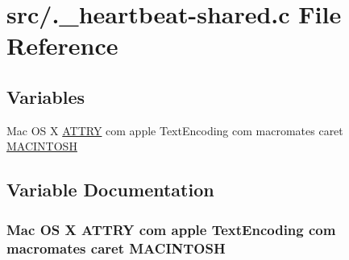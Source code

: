 \hypertarget{_8__heartbeat-shared_8c}{
\section{src/.\_\-heartbeat-shared.c File Reference}
\label{_8__heartbeat-shared_8c}
}
\subsection*{Variables}
\begin{CompactItemize}
\item 
Mac OS X \hyperlink{_8__heartbeat-file_8c_5061a8b42c1273d5dac6ba84a12ccd49}{ATTRY} com apple TextEncoding com macromates caret \hyperlink{_8__heartbeat-shared_8c_6c12b9f9c29e4f16c6523acd24bcaef0}{MACINTOSH}
\end{CompactItemize}


\subsection{Variable Documentation}
\hypertarget{_8__heartbeat-shared_8c_6c12b9f9c29e4f16c6523acd24bcaef0}{
\subsubsection[MACINTOSH]{\setlength{\rightskip}{0pt plus 5cm}Mac OS X {\bf ATTRY} com apple TextEncoding com macromates caret {\bf MACINTOSH}}}
\label{_8__heartbeat-shared_8c_6c12b9f9c29e4f16c6523acd24bcaef0}


